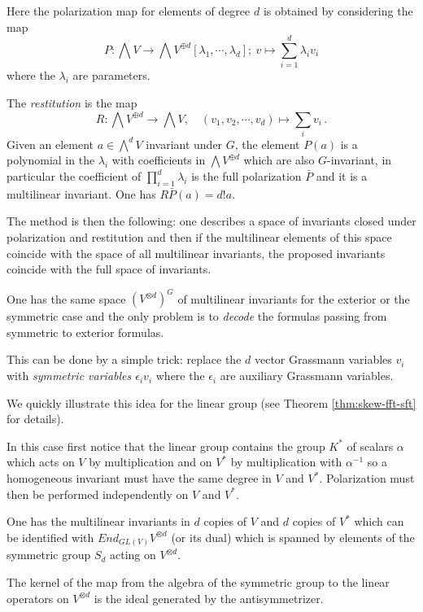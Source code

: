 \documentclass[10pt]{amsart}
\theoremstyle{definition}
\theoremstyle{remark}
\begin{document}
Here the polarization map for elements of degree $d$  is obtained by considering the map 
$$P: \bigwedge   V  \to \bigwedge   V^{\oplus d}  [\lambda_1,\cdots,\lambda_d];\  v\mapsto \sum_{i=1}^d\lambda_i v_i$$ where the $\lambda_i$ are parameters.

The {\em restitution} is the map  
$$R: \bigwedge   V^{\oplus d}  \to \bigwedge   V  ,\quad (v_1,v_2,\cdots, v_d)\mapsto\sum_iv_i\,.$$
Given an element  $a\in \bigwedge^dV$ invariant  under $G$, the element $P(a)$ is a polynomial in the $\lambda_i$ with coefficients in $\bigwedge   V^{\oplus d}  $ which are also $G$-invariant, in particular the coefficient of $\prod_{i=1}^d\lambda_i$  is the full polarization $\bar P$ and it is a multilinear invariant. One has $R\bar P(a)=d!a$.\medskip

The method is then the following: one describes a space of invariants closed under polarization and restitution  and then if the multilinear elements of this space coincide with the space of all multilinear invariants, the proposed invariants coincide with the full space of invariants.
\smallskip


One has the same space $(V^{\otimes d})^G$ of multilinear invariants for the exterior  or the symmetric case and the only problem is to {\em decode} the formulas  passing from symmetric to exterior formulas.  \smallskip

This can be done by a simple trick: replace the $d$ vector Grassmann variables $v_i$  with {\em symmetric variables $\epsilon_iv_i$}  where the $\epsilon_i$  are auxiliary Grassmann variables.  
\smallskip


We quickly illustrate this idea  for the linear group (see Theorem \ref{thm:skew-fft-sft} for details). 

 In this case first notice that the linear group contains the group $K^*$ of scalars $\alpha$ which acts on $V$ by multiplication and on $V^*$   by multiplication with  $\alpha^{-1}$ so a homogeneous invariant must have the same degree in $V$ and $V^*$. Polarization must then be performed independently on $V$ and $V^*$.
 
   One has the multilinear invariants  in $d$ copies of $V$ and $d$ copies of $V^*$  which can be identified with $End_{GL(V)}V^{\otimes  d}$  (or its dual) which is spanned by elements of the symmetric group  $S_d$   acting on $V^{\otimes  d}$.  
 

 
 The kernel of the map from the algebra of the symmetric group to the linear operators on $V^{\otimes  d}$  is the ideal generated by the antisymmetrizer.\smallskip
\end{document}
